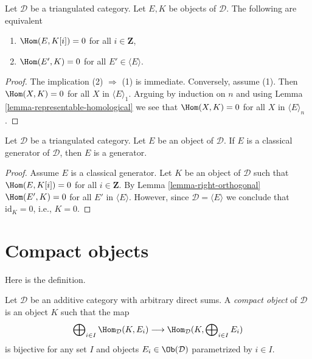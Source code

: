 \begin{lemma}
\label{lemma-right-orthogonal}
Let $\mathcal{D}$ be a triangulated category. Let $E, K$ be objects
of $\mathcal{D}$. The following are equivalent
\begin{enumerate}
\item $\Hom(E, K[i]) = 0$ for all $i \in \mathbf{Z}$,
\item $\Hom(E', K) = 0$ for all $E' \in \langle E \rangle$.
\end{enumerate}
\end{lemma}

\begin{proof}
The implication (2) $\Rightarrow$ (1) is immediate. Conversely,
assume (1). Then $\Hom(X, K) = 0$ for all $X$ in $\langle E \rangle_1$.
Arguing by induction on $n$ and using
Lemma \ref{lemma-representable-homological}
we see that $\Hom(X, K) = 0$ for all $X$
in $\langle E \rangle_n$.
\end{proof}

\begin{lemma}
\label{lemma-classical-generator-generator}
Let $\mathcal{D}$ be a triangulated category. Let $E$ be an object
of $\mathcal{D}$. If $E$ is a classical generator of $\mathcal{D}$,
then $E$ is a generator.
\end{lemma}

\begin{proof}
Assume $E$ is a classical generator. Let $K$ be an object of $\mathcal{D}$
such that $\Hom(E, K[i]) = 0$ for all $i \in \mathbf{Z}$. By
Lemma \ref{lemma-right-orthogonal}
$\Hom(E', K) = 0$ for all $E'$ in $\langle E \rangle$. However, since
$\mathcal{D} = \langle E \rangle$ we conclude that $\text{id}_K = 0$,
i.e., $K = 0$.
\end{proof}




\section{Compact objects}
\label{section-compact}

\noindent
Here is the definition.

\begin{definition}
\label{definition-compact-object}
Let $\mathcal{D}$ be an additive category with arbitrary direct
sums. A {\it compact object} of $\mathcal{D}$ is an object $K$
such that the map
$$
\bigoplus\nolimits_{i \in I} \Hom_{\mathcal{D}}(K, E_i)
\longrightarrow
\Hom_{\mathcal{D}}(K, \bigoplus\nolimits_{i \in I} E_i)
$$
is bijective for any set $I$ and objects
$E_i \in \Ob(\mathcal{D})$ parametrized by $i \in I$.
\end{definition}

